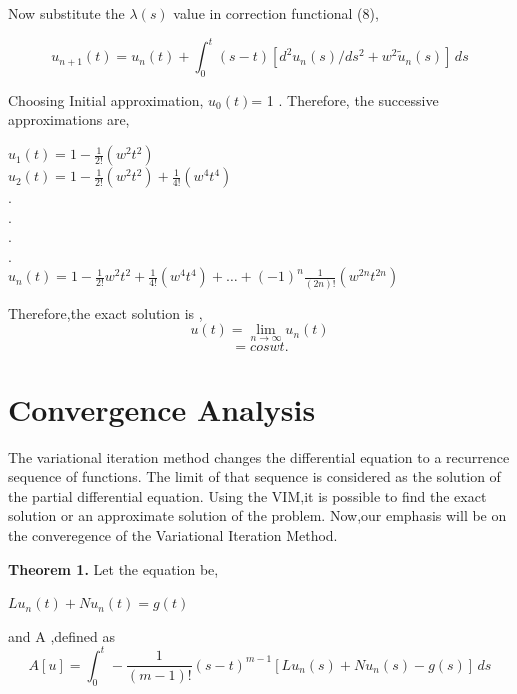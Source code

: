 \documentclass[12pt, a4paper]{report}
\begin{document}
Now substitute the $\lambda (s)$ value in correction functional (8),

\begin{equation}
    u_{n+1}(t) = u_n(t) + \int_{0}^{t} (s-t) [d^2u_n(s)/ds^2+w^2 \tilde{u}_n(s)]\,ds
\end{equation}

Choosing Initial approximation, $u_{0}(t)$= 1 . 
\vspace{2.5pt}
Therefore, the successive approximations are,

\begin{center}
    $u_{1}(t) = 1 - \frac{1}{2!} (w^2t^2)$ \\
    
    $u_{2}(t) = 1 - \frac{1}{2!} (w^2t^2) + \frac{1}{4!}(w^4 t^4)$ \\
    . \\
    
    . \\
    
    . \\
    
    . \\
    
    $u_{n}(t) = 1 - \frac{1}{2!}w^2 t^2 + \frac{1}{4!}(w^4 t^4) + \ldots + (-1)^n \frac{1}{(2n)!} (w^{2n} t^{2n})$
\end{center}

\vspace{4.5pt}
Therefore,the exact solution is ,
\[
u(t) = \lim_{{n \to \infty}} u_n(t)
\]
\[
= coswt .
\]

\section{Convergence Analysis}
The variational iteration method changes the differential equation to a recurrence sequence of functions. The limit of that sequence is considered as the solution of the partial differential equation. Using the VIM,it is possible to find the exact solution or an approximate solution of the problem. Now,our emphasis will be on the converegence of the Variational Iteration Method.

{\textbf{Theorem 1.}} Let the equation be,
\begin{center}
              $Lu_{n}(t) + Nu_{n}(t) = g(t)$
\end{center}
and A ,defined as 
\begin{equation}
A[u] = \int_0^t -\frac{1}{(m-1)!} (s-t)^{m-1} [Lu_{n}(s) + Nu_{n}(s) - g(s)] \, ds
\end{equation}
\end{document}
